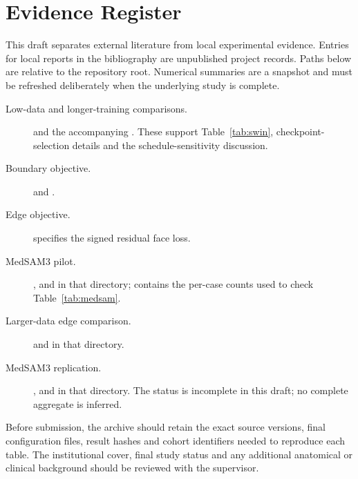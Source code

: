 \section{Evidence Register}\label{sec:evidence}
This draft separates external literature from local experimental evidence. Entries for local reports in the bibliography are unpublished project records. Paths below are relative to the repository root. Numerical summaries are a snapshot and must be refreshed deliberately when the underlying study is complete.

\begin{description}
\item[Low-data and longer-training comparisons.]
and the accompanying . These support Table~\ref{tab:swin}, checkpoint-selection details and the schedule-sensitivity discussion.
\item[Boundary objective.]
 and
.
\item[Edge objective.]
 specifies the signed residual face loss.
\item[MedSAM3 pilot.]
,
 and  in that directory;
contains the per-case counts used to check Table~\ref{tab:medsam}.
\item[Larger-data edge comparison.]
and  in that directory.
\item[MedSAM3 replication.]
,
 and  in that directory. The status is incomplete in this draft; no complete aggregate is inferred.
\end{description}

Before submission, the archive should retain the exact source versions, final configuration files, result hashes and cohort identifiers needed to reproduce each table. The institutional cover, final study status and any additional anatomical or clinical background should be reviewed with the supervisor.
